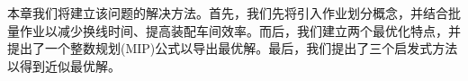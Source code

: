 本章我们将建立该问题的解决方法。首先，我们先将引入作业划分概念，并结合批量作业以减少换线时间、提高装配车间效率。而后，我们建立两个最优化特点，并提出了一个整数规划(MIP)公式以导出最优解。最后，我们提出了三个启发式方法以得到近似最优解。

